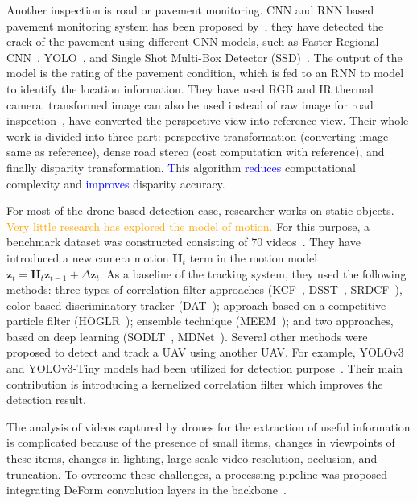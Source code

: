 Another  inspection is road or pavement monitoring.  CNN and RNN based pavement monitoring system has been proposed by~\cite{wu2018coupling},  they have detected the crack of the pavement using different CNN models, such as Faster Regional-CNN~\cite{ren2015faster}, YOLO~\cite{redmon2016you}, and Single Shot Multi-Box Detector (SSD)~\cite{liu2016ssd}. The output of the model is the rating of the pavement condition, which is fed to an RNN to model to identify the location information. They have used RGB and IR thermal camera.
 transformed image can also be used instead of raw image for road inspection~\cite{fan2019real},  have converted the perspective view into reference view. Their whole work is divided into three part: perspective transformation (converting image same as reference), dense road stereo (cost computation with reference), and finally disparity transformation. \textcolor{blue}{T}his algorithm \textcolor{blue}{reduces} computational complexity  and \textcolor{blue}{improves} disparity accuracy. 

For most of the drone-based detection case, researcher works on static objects. \textcolor{orange}{Very little research has explored the model of motion.} For this purpose, a benchmark dataset was constructed consisting of 70 videos~\cite{li2017visual}. They have introduced a new camera motion $\mathbf{H}_{t}$ term in the motion model $\mathbf{z}_{t}=\mathbf{H}_{t} \mathbf{z}_{t-1}+\Delta \mathbf{z}_{t}$. As a baseline of the tracking system, they used the following methods: three types of correlation filter approaches (KCF~\cite{henriques2014high}, DSST~\cite{danelljan2014accurate}, SRDCF~\cite{danelljan2015learning}), color-based discriminatory tracker (DAT~\cite{possegger2015defense}); approach based on a competitive particle filter (HOGLR~\cite{wang2015understanding}); ensemble technique (MEEM~\cite{zhang2014meem}); and two approaches, based on deep learning (SODLT~\cite{wang2015transferring}, MDNet~\cite{nam2016learning}). Several other methods were proposed to detect and track a UAV using another UAV. For example, YOLOv3 and YOLOv3-Tiny models had been utilized for detection purpose~\cite{saribas2019hybrid}. Their main contribution is introducing a kernelized  correlation filter which improves the detection result. 

The analysis of videos captured by drones for the extraction of useful information is complicated because of the presence of small items, changes in viewpoints of these items, changes in lighting, large-scale video resolution, occlusion, and truncation. To overcome these challenges, a processing pipeline  was proposed integrating DeForm convolution layers in the backbone~\cite{zhang2019dense}.

